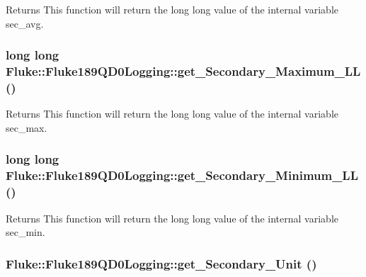\label{classFluke_1_1Fluke189QD0Logging_a1f33bcc2d2342018f0a1ef5b4ec3caa0}
\begin{DoxyReturn}{Returns}
This function will return the long long value of the internal variable sec\_\-avg. 
\end{DoxyReturn}
\hypertarget{classFluke_1_1Fluke189QD0Logging_a6f0d87ff7022cf47120fd477698639ea}{
\subsubsection[{get\_\-Secondary\_\-Maximum\_\-LL}]{\setlength{\rightskip}{0pt plus 5cm}long long Fluke::Fluke189QD0Logging::get\_\-Secondary\_\-Maximum\_\-LL ()}}
\label{classFluke_1_1Fluke189QD0Logging_a6f0d87ff7022cf47120fd477698639ea}
\begin{DoxyReturn}{Returns}
This function will return the long long value of the internal variable sec\_\-max. 
\end{DoxyReturn}
\hypertarget{classFluke_1_1Fluke189QD0Logging_a4086fe72824fc857356582a962d78678}{
\subsubsection[{get\_\-Secondary\_\-Minimum\_\-LL}]{\setlength{\rightskip}{0pt plus 5cm}long long Fluke::Fluke189QD0Logging::get\_\-Secondary\_\-Minimum\_\-LL ()}}
\label{classFluke_1_1Fluke189QD0Logging_a4086fe72824fc857356582a962d78678}
\begin{DoxyReturn}{Returns}
This function will return the long long value of the internal variable sec\_\-min. 
\end{DoxyReturn}
\hypertarget{classFluke_1_1Fluke189QD0Logging_a7d50361ed373ebaf4bf9cd7bf101f93d}{
\subsubsection[{get\_\-Secondary\_\-Unit}]{ Fluke::Fluke189QD0Logging::get\_\-Secondary\_\-Unit ()}}
